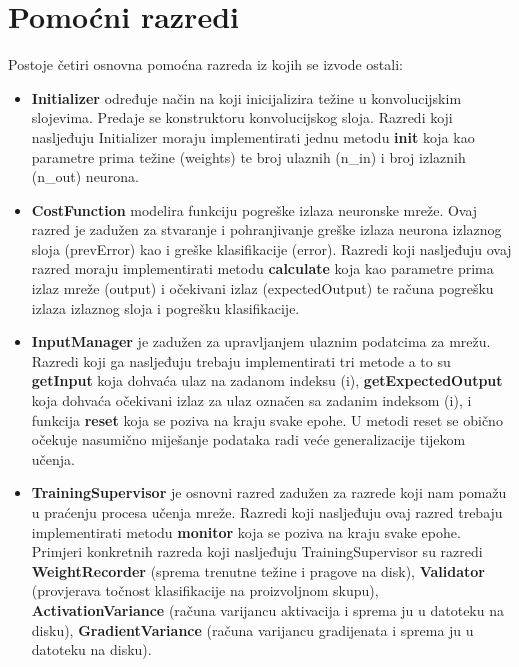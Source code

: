 \documentclass[times, utf8, zavrsni, numeric]{fer}
\begin{document}
\section{Pomoćni razredi}
Postoje četiri osnovna pomoćna razreda iz kojih se izvode ostali:
\begin{itemize}
\item \textbf{Initializer} određuje način na koji inicijalizira težine u konvolucijskim slojevima. Predaje se konstruktoru konvolucijskog sloja. Razredi koji nasljeđuju Initializer moraju implementirati jednu metodu \textbf{init} koja kao parametre prima težine (weights) te broj ulaznih (n\_in) i broj izlaznih (n\_out) neurona.
\item \textbf{CostFunction} modelira funkciju pogreške izlaza neuronske mreže. Ovaj razred je zadužen za stvaranje i pohranjivanje greške izlaza neurona izlaznog sloja (prevError) kao i greške klasifikacije (error). Razredi koji nasljeđuju ovaj razred moraju implementirati metodu \textbf{calculate} koja kao parametre prima izlaz mreže (output) i očekivani izlaz (expectedOutput) te računa pogrešku izlaza izlaznog sloja i pogrešku klasifikacije.
\item \textbf{InputManager} je zadužen za upravljanjem ulaznim podatcima za mrežu. Razredi koji ga nasljeđuju trebaju implementirati tri metode a to su \textbf{getInput} koja dohvaća ulaz na zadanom indeksu (i), \textbf{getExpectedOutput} koja dohvaća očekivani izlaz za ulaz označen sa zadanim indeksom (i), i funkcija \textbf{reset} koja se poziva na kraju svake epohe. U metodi reset se obično očekuje nasumično miješanje podataka radi veće generalizacije tijekom učenja.
\item \textbf{TrainingSupervisor} je osnovni razred zadužen za razrede koji nam pomažu u praćenju procesa učenja mreže. Razredi koji nasljeđuju ovaj razred trebaju implementirati metodu \textbf{monitor} koja se poziva na kraju svake epohe. Primjeri konkretnih razreda koji nasljeđuju TrainingSupervisor su razredi \textbf{WeightRecorder} (sprema trenutne težine i pragove na disk), \textbf{Validator} (provjerava točnost klasifikacije na proizvoljnom skupu), \textbf{ActivationVariance} (računa varijancu aktivacija i sprema ju u datoteku na disku), \textbf{GradientVariance} (računa varijancu gradijenata i sprema ju u datoteku na disku).
\end{itemize}
\end{document}
